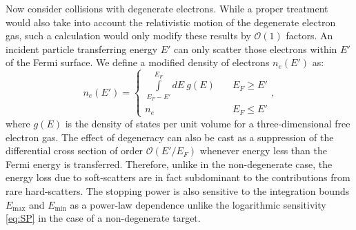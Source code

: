 \documentclass[twocolumn,showpacs,preprintnumbers,amsmath,amssymb,prd]{revtex4}
\newcommand{\OO}{\mathcal{O}}
\begin{document}
\begin{appendices}
Now consider collisions with degenerate electrons.
While a proper treatment would also take into account the relativistic motion of the degenerate electron gas, such a calculation would only modify these results by $\OO(1)$ factors. 
An incident particle transferring energy $E'$ can only scatter those electrons within $E'$ of the Fermi surface.
We define a modified density of electrons $n_e(E')$ as:
\begin{equation}
\label{eq:pauliblocking}
n_e(E') = \left\{
        \begin{array}{ll}
            \displaystyle \int \limits_{E_F -E'}^{E_F}dE ~g(E) & \quad E_F \geq E' \\
            n_e & \quad E_F \leq E'
        \end{array}
    \right.,
\end{equation}
where $g(E)$ is the density of states per unit volume for a three-dimensional free electron gas.
The effect of degeneracy can also be cast as a suppression of the differential cross section of order $\mathcal{O}(E'/E_F)$ whenever energy less than the Fermi energy is transferred.
Therefore, unlike in the non-degenerate case, the energy loss due to soft-scatters are in fact subdominant to the contributions from rare hard-scatters.
The stopping power is also sensitive to the integration bounds $E_{\text{max}}$ and $E_{\text{min}}$ as a power-law dependence unlike the logarithmic sensitivity \eqref{eq:SP} in the case of a non-degenerate target.


\end{appendices}
\end{document}
